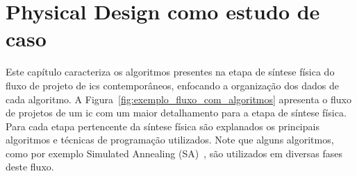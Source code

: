 \chapter{Physical Design como estudo de caso}
\label{cap:caracterizacaoSinteseFisica}




Este capítulo caracteriza os algoritmos presentes na etapa de síntese física do fluxo de projeto de \acp{ic} contemporâneos, enfocando a organização dos dados de cada algoritmo.
A Figura~\ref{fig:exemplo_fluxo_com_algoritmos} apresenta o fluxo de projetos de um \ac{ic} com um maior detalhamento para a etapa de síntese física. 
Para cada etapa pertencente da síntese física são explanados os principais algoritmos e técnicas de programação utilizados.
Note que alguns algoritmos, como por exemplo Simulated Annealing (SA)~\cite{russell2009artificial}, são utilizados em diversas fases deste fluxo.

